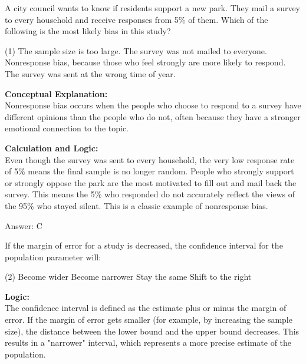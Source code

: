 \documentclass[11pt,paper=a4,answers]{exam}
\begin{document}
\begin{questions}
\question
A city council wants to know if residents support a new park. They mail a survey to every household and receive responses from 5\% of them. Which of the following is the most likely bias in this study?
\begin{tasks}(1)
    \task The sample size is too large.
    \task The survey was not mailed to everyone.
    \task Nonresponse bias, because those who feel strongly are more likely to respond.
    \task The survey was sent at the wrong time of year.
\end{tasks}

\begin{solution}
\textbf{Conceptual Explanation:} \\
Nonresponse bias occurs when the people who choose to respond to a survey have different opinions than the people who do not, often because they have a stronger emotional connection to the topic.

\vspace{30pt}

\textbf{Calculation and Logic:} \\
Even though the survey was sent to every household, the very low response rate of 5\% means the final sample is no longer random. People who strongly support or strongly oppose the park are the most motivated to fill out and mail back the survey. This means the 5\% who responded do not accurately reflect the views of the 95\% who stayed silent. This is a classic example of nonresponse bias.

\vspace{30pt}

Answer: \colorbox{yellow!100}{C}
\end{solution}

\vspace{60pt}

\question
If the margin of error for a study is decreased, the confidence interval for the population parameter will:
\begin{tasks}(2)
    \task Become wider
    \task Become narrower
    \task Stay the same
    \task Shift to the right
\end{tasks}

\begin{solution}
\textbf{Logic:} \\
The confidence interval is defined as the estimate plus or minus the margin of error. If the margin of error gets smaller (for example, by increasing the sample size), the distance between the lower bound and the upper bound decreases. This results in a "narrower" interval, which represents a more precise estimate of the population.


\end{solution}
\end{questions}
\end{document}

